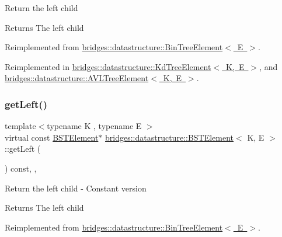 Return the left child \begin{DoxyReturn}{Returns}
The left child 
\end{DoxyReturn}


Reimplemented from \mbox{\hyperlink{classbridges_1_1datastructure_1_1_bin_tree_element_ab30cfe373892c52709d5f1df013a0c82}{bridges\+::datastructure\+::\+Bin\+Tree\+Element$<$ E $>$}}.



Reimplemented in \mbox{\hyperlink{classbridges_1_1datastructure_1_1_kd_tree_element_a875bfa2dfd88a7740f7bcd28a117c12a}{bridges\+::datastructure\+::\+Kd\+Tree\+Element$<$ K, E $>$}}, and \mbox{\hyperlink{classbridges_1_1datastructure_1_1_a_v_l_tree_element_ab05925e343b9fa71b61c71e8034e1293}{bridges\+::datastructure\+::\+A\+V\+L\+Tree\+Element$<$ K, E $>$}}.

\mbox{\label{classbridges_1_1datastructure_1_1_b_s_t_element_abac324ef0b480420bd82ecfe4501d60d}} 
\subsubsection{\texorpdfstring{getLeft()}{getLeft()}\hspace{0.1cm}{\footnotesize\ttfamily [2/2]}}
{\footnotesize\ttfamily template$<$typename K , typename E $>$ \\
virtual const \mbox{\hyperlink{classbridges_1_1datastructure_1_1_b_s_t_element}{B\+S\+T\+Element}}$\ast$ \mbox{\hyperlink{classbridges_1_1datastructure_1_1_b_s_t_element}{bridges\+::datastructure\+::\+B\+S\+T\+Element}}$<$ K, E $>$\+::get\+Left (\begin{DoxyParamCaption}{ }\end{DoxyParamCaption}) const\hspace{0.3cm}{\ttfamily [inline]}, {\ttfamily [override]}, {\ttfamily [virtual]}}

Return the left child -\/ Constant version

\begin{DoxyReturn}{Returns}
The left child 
\end{DoxyReturn}


Reimplemented from \mbox{\hyperlink{classbridges_1_1datastructure_1_1_bin_tree_element_ae14a70e2d25ad62337c87059b0cadb48}{bridges\+::datastructure\+::\+Bin\+Tree\+Element$<$ E $>$}}.



